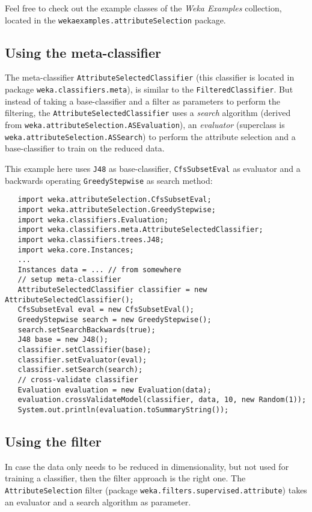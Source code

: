 Feel free to check out the example classes of the \textit{Weka Examples}
collection\cite{wekaexamples}, located in the
\texttt{wekaexamples.attributeSelection} package.

\newpage

\subsection{Using the meta-classifier}
The meta-classifier \texttt{AttributeSelectedClassifier} (this classifier
is located in package \texttt{weka.classifiers.meta}), is similar to the
\texttt{FilteredClassifier}. But instead of taking a base-classifier and a
filter as parameters to perform the filtering, the
\texttt{AttributeSelectedClassifier} uses a \textit{search} algorithm (derived
from \texttt{weka.attributeSelection.ASEvaluation}), an \textit{evaluator}
(superclass is \texttt{weka.attributeSelection.ASSearch}) to perform the
attribute selection and a base-classifier to train on the reduced data.

This example here uses \texttt{J48} as base-classifier, \texttt{CfsSubsetEval}
as evaluator and a backwards operating \texttt{GreedyStepwise} as search method:
\begin{verbatim}
   import weka.attributeSelection.CfsSubsetEval;
   import weka.attributeSelection.GreedyStepwise;
   import weka.classifiers.Evaluation;
   import weka.classifiers.meta.AttributeSelectedClassifier;
   import weka.classifiers.trees.J48;
   import weka.core.Instances;
   ...
   Instances data = ... // from somewhere
   // setup meta-classifier
   AttributeSelectedClassifier classifier = new AttributeSelectedClassifier();
   CfsSubsetEval eval = new CfsSubsetEval();
   GreedyStepwise search = new GreedyStepwise();
   search.setSearchBackwards(true);
   J48 base = new J48();
   classifier.setClassifier(base);
   classifier.setEvaluator(eval);
   classifier.setSearch(search);
   // cross-validate classifier
   Evaluation evaluation = new Evaluation(data);
   evaluation.crossValidateModel(classifier, data, 10, new Random(1));
   System.out.println(evaluation.toSummaryString());
\end{verbatim}

\newpage

\subsection{Using the filter}
In case the data only needs to be reduced in dimensionality, but not used for
training a classifier, then the filter approach is the right one. The
\texttt{AttributeSelection} filter (package
\texttt{weka.filters.supervised.attribute}) takes an evaluator and a search
algorithm as parameter.

